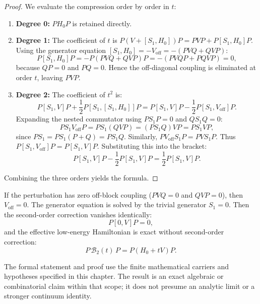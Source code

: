 \begin{proof}
We evaluate the compression order by order in $t$:
\begin{enumerate}
    \item \textbf{Degree 0:} $P H_0 P$ is retained directly.
    \item \textbf{Degree 1:} The coefficient of $t$ is $P(V + [S_1, H_0])P = PVP + P[S_1, H_0]P$.
    Using the generator equation $[S_1, H_0] = -V_{\mathrm{off}} = -(PVQ + QVP)$:
    \[
    P [S_1, H_0] P = - P (P V Q + Q V P) P = - (P V Q P + P Q V P) = 0,
    \]
    because $Q P = 0$ and $P Q = 0$. Hence the off-diagonal coupling is eliminated at order $t$, leaving $P V P$.
    \item \textbf{Degree 2:} The coefficient of $t^2$ is:
    \[
    P [S_1, V] P + \frac{1}{2} P [S_1, [S_1, H_0]] P = P [S_1, V] P - \frac{1}{2} P [S_1, V_{\mathrm{off}}] P.
    \]
    Expanding the nested commutator using $P S_1 P = 0$ and $Q S_1 Q = 0$:
    \[
    P S_1 V_{\mathrm{off}} P = P S_1 (Q V P) = (P S_1 Q) V P = P S_1 V P,
    \]
    since $P S_1 = P S_1 (P + Q) = P S_1 Q$. Similarly, $P V_{\mathrm{off}} S_1 P = P V S_1 P$.
    Thus $P [S_1, V_{\mathrm{off}}] P = P [S_1, V] P$.
    Substituting this into the bracket:
    \[
    P [S_1, V] P - \frac{1}{2} P [S_1, V] P = \frac{1}{2} P [S_1, V] P.
    \]
\end{enumerate}
Combining the three orders yields the formula.
\end{proof}

\begin{theorem}
\label{thm:app_sw_off_zero}
If the perturbation has zero off-block coupling ($P V Q = 0$ and $Q V P = 0$), then $V_{\mathrm{off}} = 0$.
The generator equation is solved by the trivial generator $S_1 = 0$.
Then the second-order correction vanishes identically:
\begin{equation}
P [0, V] P = 0,
\end{equation}
and the effective low-energy Hamiltonian is exact without second-order correction:
\begin{equation}
P \, \mathcal{B}_2(t) \, P = P (H_0 + t V) P.
\end{equation}
\end{theorem}

\begin{remark}
The formal statement and proof use the finite mathematical carriers and hypotheses specified in this chapter. The result is an exact algebraic or combinatorial claim within that scope; it does not presume an analytic limit or a stronger continuum identity.
\end{remark}

